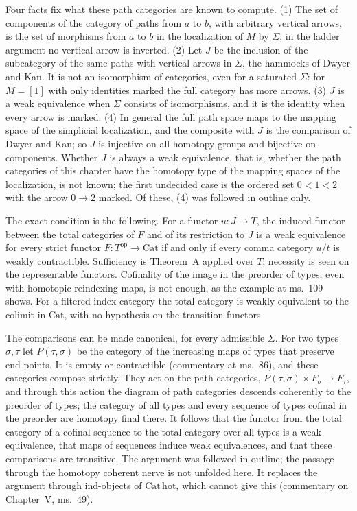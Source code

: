 Four facts fix what these path categories are known to compute. (1) The set of components of the category of paths from $a$ to $b$, with arbitrary vertical arrows, is the set of morphisms from $a$ to $b$ in the localization of $M$ by $\Sigma$; in the ladder argument no vertical arrow is inverted. (2) Let $J$ be the inclusion of the subcategory of the same paths with vertical arrows in $\Sigma$, the hammocks of Dwyer and Kan. It is not an isomorphism of categories, even for a saturated $\Sigma$: for $M=[1]$ with only identities marked the full category has more arrows. (3) $J$ is a weak equivalence when $\Sigma$ consists of isomorphisms, and it is the identity when every arrow is marked. (4) In general the full path space maps to the mapping space of the simplicial localization, and the composite with $J$ is the comparison of Dwyer and Kan; so $J$ is injective on all homotopy groups and bijective on components. Whether $J$ is always a weak equivalence, that is, whether the path categories of this chapter have the homotopy type of the mapping spaces of the localization, is not known; the first undecided case is the ordered set $0<1<2$ with the arrow $0\to2$ marked. Of these, (4) was followed in outline only.

The exact condition is the following. For a functor $u:J\to T$, the induced functor between the total categories of $F$ and of its restriction to $J$ is a weak equivalence for every strict functor $F:T^{\mathrm{op}}\to\mathrm{Cat}$ if and only if every comma category $u/t$ is weakly contractible. Sufficiency is Theorem~A applied over $T$; necessity is seen on the representable functors. Cofinality of the image in the preorder of types, even with homotopic reindexing maps, is not enough, as the example at ms.~109 shows. For a filtered index category the total category is weakly equivalent to the colimit in $\mathrm{Cat}$, with no hypothesis on the transition functors.

The comparisons can be made canonical, for every admissible $\Sigma$. For two types $\sigma,\tau$ let $P(\tau,\sigma)$ be the category of the increasing maps of types that preserve end points. It is empty or contractible (commentary at ms.~86), and these categories compose strictly. They act on the path categories, $P(\tau,\sigma)\times F_\sigma\to F_\tau$, and through this action the diagram of path categories descends coherently to the preorder of types; the category of all types and every sequence of types cofinal in the preorder are homotopy final there. It follows that the functor from the total category of a cofinal sequence to the total category over all types is a weak equivalence, that maps of sequences induce weak equivalences, and that these comparisons are transitive. The argument was followed in outline; the passage through the homotopy coherent nerve is not unfolded here. It replaces the argument through ind-objects of $\mathrm{Cat}\,\mathrm{hot}$, which cannot give this (commentary on Chapter~V, ms.~49).

